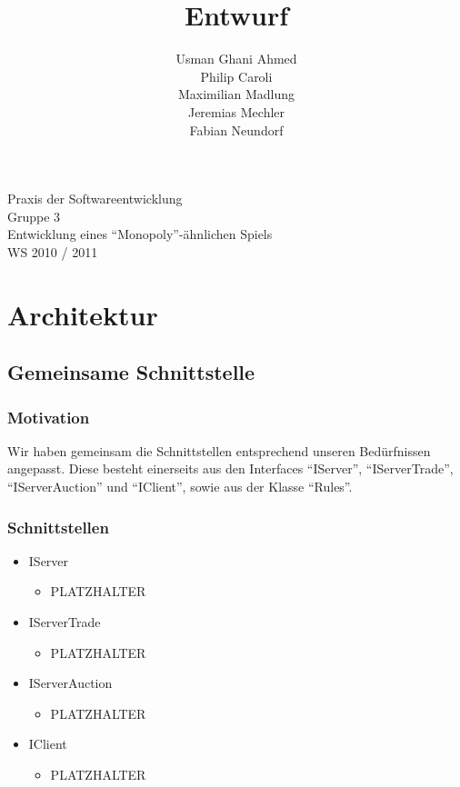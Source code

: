 \documentclass[a4paper,10pt]{article}
\title{Entwurf}
\date{}
\author{Usman Ghani Ahmed \\
Philip Caroli\\
Maximilian Madlung\\ 
Jeremias Mechler\\ 
Fabian Neundorf}
\begin{document}
 
\vspace{5cm}
\maketitle
\begin{center}
\vspace{3cm}
\huge{Praxis der Softwareentwicklung \\
Gruppe 3 \\[0.5cm]
Entwicklung eines "`Monopoly"'-ähnlichen Spiels \\[0.5cm]
WS 2010 / 2011} \\[2cm]
\end{center}

\newpage

\tableofcontents

\newpage

\section{Architektur}

\subsection{Gemeinsame Schnittstelle}
\subsubsection{Motivation}
Wir haben gemeinsam die Schnittstellen entsprechend unseren Bedürfnissen angepasst. Diese besteht einerseits aus den Interfaces "`IServer"', "`IServerTrade"', "`IServerAuction"' und "`IClient"', sowie aus der Klasse "`Rules"'.
\subsubsection{Schnittstellen}
\begin{itemize}
\item IServer
\begin{itemize}
\item PLATZHALTER
\end{itemize}
\item IServerTrade
\begin{itemize}
\item PLATZHALTER
\end{itemize}
\item IServerAuction
\begin{itemize}
\item PLATZHALTER
\end{itemize}
\item IClient
\begin{itemize}
\item PLATZHALTER
\end{itemize}
\end{itemize} %
\end{document}
